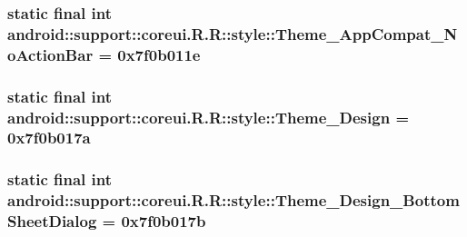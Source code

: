 \hypertarget{classandroid_1_1support_1_1coreui_1_1_r_1_1style_b3a3ac4903f17bd5cd15b831cf6a828a}{
\subsubsection[{Theme\_\-AppCompat\_\-NoActionBar}]{\setlength{\rightskip}{0pt plus 5cm}static final int android::support::coreui.R.R::style::Theme\_\-AppCompat\_\-NoActionBar = 0x7f0b011e}}
\label{classandroid_1_1support_1_1coreui_1_1_r_1_1style_b3a3ac4903f17bd5cd15b831cf6a828a}


\hypertarget{classandroid_1_1support_1_1coreui_1_1_r_1_1style_06fe75f2baf8b08a17983300d1b6efec}{
\subsubsection[{Theme\_\-Design}]{\setlength{\rightskip}{0pt plus 5cm}static final int android::support::coreui.R.R::style::Theme\_\-Design = 0x7f0b017a}}
\label{classandroid_1_1support_1_1coreui_1_1_r_1_1style_06fe75f2baf8b08a17983300d1b6efec}


\hypertarget{classandroid_1_1support_1_1coreui_1_1_r_1_1style_47cfb777e66469f762965e8e5e4cc922}{
\subsubsection[{Theme\_\-Design\_\-BottomSheetDialog}]{\setlength{\rightskip}{0pt plus 5cm}static final int android::support::coreui.R.R::style::Theme\_\-Design\_\-BottomSheetDialog = 0x7f0b017b}}
\label{classandroid_1_1support_1_1coreui_1_1_r_1_1style_47cfb777e66469f762965e8e5e4cc922}



